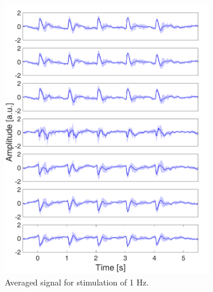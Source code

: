 \documentclass{pracalicmgr}
\begin{document}
    \begin{figure}[H]
    \begin{subfigure}{.5\textwidth}
	\centering
		\includegraphics[width=1.\linewidth]{srednie_1Hz_5s.png}
		\caption{Averaged signal for stimulation of 1 Hz.}
		\label{rys:srednie_1Hz}
	\end{subfigure}
	\begin{subfigure}{.5\textwidth}
			\centering

\end{subfigure}
\end{figure}
\end{document}
